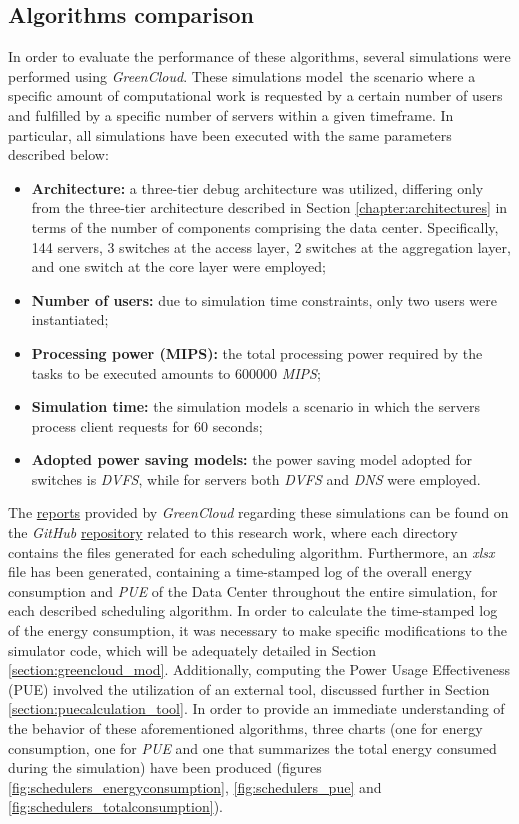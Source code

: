 \subsection{Algorithms comparison}
In order to evaluate the performance of these algorithms, several simulations were performed using \emph{GreenCloud}. These simulations model\ the scenario where a specific amount of computational work is requested by a certain number of users and fulfilled by a specific number of servers within a given timeframe. In particular, all simulations have been executed with the same parameters described below:
\begin{itemize}
    \item \textbf{Architecture: } a three-tier debug architecture was utilized, differing only from the three-tier architecture described in Section \ref{chapter:architectures} in terms of the number of components comprising the data center. Specifically, 144 servers, 3 switches at the access layer, 2 switches at the aggregation layer, and one switch at the core layer were employed;
    \item \textbf{Number of users: } due to simulation time constraints, only two users were instantiated;
    \item \textbf{Processing power (MIPS): } the total processing power required by the tasks to be executed amounts to 600000 \emph{MIPS};
    \item \textbf{Simulation time: } the simulation models a scenario in which the servers process client requests for 60 seconds;
    \item \textbf{Adopted power saving models: } the power saving model adopted for switches is \emph{DVFS}, while for servers both \emph{DVFS} and \emph{DNS} were employed.
\end{itemize}
The \href{https://github.com/vincenzo-emanuele/masters-degree-thesis/tree/main/scheduling\_algorithms\_comparison/simulations}{reports} provided by \emph{GreenCloud} regarding these simulations can be found on the \emph{GitHub} \href{https://github.com/vincenzo-emanuele/masters-degree-thesis}{repository} related to this research work, where each directory contains the files generated for each scheduling algorithm. Furthermore, an \emph{xlsx} file has been generated, containing a time-stamped log of the overall energy consumption and \emph{PUE} of the Data Center throughout the entire simulation, for each described scheduling algorithm. In order to calculate the time-stamped log of the energy consumption, it was necessary to make specific modifications to the simulator code, which will be adequately detailed in Section \ref{section:greencloud_mod}. Additionally, computing the Power Usage Effectiveness (PUE) involved the utilization of an external tool, discussed further in Section \ref{section:puecalculation_tool}. In order to provide an immediate understanding of the behavior of these aforementioned algorithms, three charts (one for energy consumption, one for \emph{PUE} and one that summarizes the total energy consumed during the simulation) have been produced (figures \ref{fig:schedulers_energyconsumption}, \ref{fig:schedulers_pue} and \ref{fig:schedulers_totalconsumption}). \\
